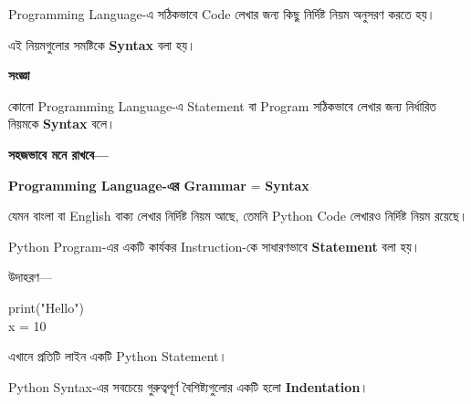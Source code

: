 
Programming Language-এ সঠিকভাবে Code লেখার জন্য কিছু
নির্দিষ্ট নিয়ম অনুসরণ করতে হয়।

এই নিয়মগুলোর সমষ্টিকে \textbf{Syntax} বলা হয়।



\begin{definitionbox}

\textbf{\color{darkTeal}সংজ্ঞা}

কোনো Programming Language-এ Statement বা Program
সঠিকভাবে লেখার জন্য নির্ধারিত নিয়মকে
\textbf{Syntax} বলে।

\end{definitionbox}

\textbf{সহজভাবে মনে রাখবে—}

\begin{center}

\textbf{Programming Language-এর Grammar}
=
\textbf{Syntax}

\end{center}

যেমন বাংলা বা English বাক্য লেখার নির্দিষ্ট নিয়ম আছে,
তেমনি Python Code লেখারও নির্দিষ্ট নিয়ম রয়েছে।



Python Program-এর একটি কার্যকর Instruction-কে সাধারণভাবে
\textbf{Statement} বলা হয়।

উদাহরণ—

\begin{codebox}

\begin{english}
\ttfamily
print("Hello")\\
x = 10
\end{english}

\end{codebox}

এখানে প্রতিটি লাইন একটি Python Statement।



Python Syntax-এর সবচেয়ে গুরুত্বপূর্ণ বৈশিষ্ট্যগুলোর একটি হলো
\textbf{Indentation}।

